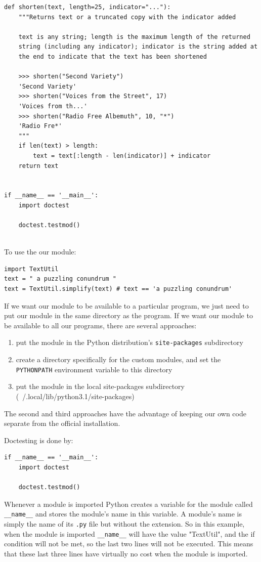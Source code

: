 \begin{lstlisting}
def shorten(text, length=25, indicator="..."):
    """Returns text or a truncated copy with the indicator added

    text is any string; length is the maximum length of the returned
    string (including any indicator); indicator is the string added at
    the end to indicate that the text has been shortened

    >>> shorten("Second Variety")
    'Second Variety'
    >>> shorten("Voices from the Street", 17)
    'Voices from th...'
    >>> shorten("Radio Free Albemuth", 10, "*")
    'Radio Fre*'
    """
    if len(text) > length:
        text = text[:length - len(indicator)] + indicator
    return text


if __name__ == '__main__':
    import doctest

    doctest.testmod()
  
\end{lstlisting}


To use the our module:
\begin{lstlisting}
import TextUtil
text = " a puzzling conundrum "
text = TextUtil.simplify(text) # text == 'a puzzling conundrum'
\end{lstlisting}


If we want our module to be available to a particular program, we just need to put our module in the same directory as the program.
If we want our module to be available to all our programs, there are several approaches:
\begin{enumerate}
\item put the module in the Python distribution's \verb|site-packages| subdirectory
\item create a directory specifically for the custom modules, and set the \verb|PYTHONPATH| environment variable to this directory
\item put the module in the local site-packages subdirectory (~/.local/lib/python3.1/site-packages)
\end{enumerate}

The second and third approaches have the advantage of keeping our own code separate from the official installation.



Doctesting is done by:
\begin{lstlisting}
if __name__ == '__main__':
    import doctest

    doctest.testmod()
\end{lstlisting}

Whenever a module is imported Python creates a variable for the module called \verb|__name__| and stores the module’s name in this variable.
A module’s name is simply the name of its \verb|.py| file but without the extension.
So in this example, when the module is imported \verb|__name__| will have the value "TextUtil", and the if condition will not be met, so the last two lines will not be executed.
This means that these last three lines have virtually no cost when the module is imported.



